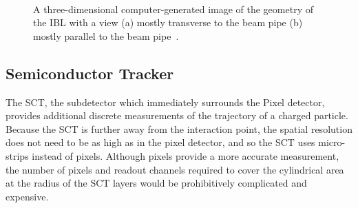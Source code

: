 \begin{figure}[hbtp]
\centering
{}\\
\caption{A three-dimensional computer-generated image of the geometry of the \acs*{IBL} with a view (a) mostly transverse to the beam pipe (b) mostly parallel to the beam pipe~\cite{ibl_tdr}.}
\label{fig:ibl_geometry}
\end{figure}

\subsection{Semiconductor Tracker}

The \ac{SCT}, the subdetector which immediately surrounds the Pixel detector, provides additional discrete measurements of the trajectory of a charged particle.
Because the \ac{SCT} is further away from the interaction point, the spatial resolution does not need to be as high as in the pixel detector, and so the \ac{SCT} uses micro-strips instead of pixels. 
Although pixels provide a more accurate measurement, the number of pixels and readout channels required to cover the cylindrical area at the radius of the \ac{SCT} layers would be prohibitively complicated and expensive.

